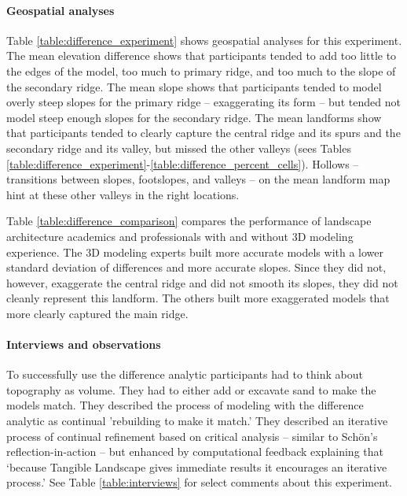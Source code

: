 \documentclass[prodmode,acmtochi]{acmsmall} %
\begin{document}
\paragraph{Geospatial analyses}
Table \ref{table:difference_experiment} 
shows geospatial analyses for this experiment.
%
The mean elevation difference shows that participants tended to add
too little to the edges of the model,
too much to primary ridge,
and too much to the slope of the secondary ridge. 
The mean slope shows that participants tended to model 
overly steep slopes for the primary ridge -- exaggerating its form --
but tended not model steep enough slopes for the secondary ridge. 
The mean landforms show that participants tended to 
clearly capture the central ridge and its spurs and
the secondary ridge and its valley, but missed the 
other valleys
(sees Tables \ref{table:difference_experiment}-\ref{table:difference_percent_cells}). 
Hollows -- transitions between slopes, footslopes, and valleys -- 
on the mean landform map hint at these other 
valleys in the right locations.

Table \ref{table:difference_comparison} compares the performance of 
landscape architecture academics and professionals 
with and without 3D modeling experience. 
The 3D modeling experts built more accurate models
with a lower standard deviation of differences 
and more accurate slopes. 
Since they did not, however, exaggerate the central ridge
and did not smooth its slopes, 
they did not cleanly represent this landform. 
The others built more exaggerated models 
that more clearly captured the main ridge.

\paragraph{Interviews and observations}
To successfully use the difference analytic 
participants had to think about topography as volume.
They had to either add or excavate sand to make the models match. 
They described the process of modeling with the difference analytic
as continual 'rebuilding to make it match.'
They described an iterative process of 
continual refinement based on critical analysis 
-- similar to Sch{\"o}n's reflection-in-action \cite{Schon1983} --
but enhanced by computational feedback 
explaining that 
`because Tangible Landscape gives immediate results 
it encourages an iterative process.' 
See Table \ref{table:interviews} for select comments about this experiment.
\end{document}
